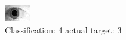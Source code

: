 \begin{figure}[h!]
\begin{center}
\includegraphics[width=0.60\columnwidth]{figures/ID1965_class_4_target_3.png}
\end{center}
\caption{ Classification: 4 actual target: 3}
\label{fig:ID1965_class_4_target_3}
\end{figure}
